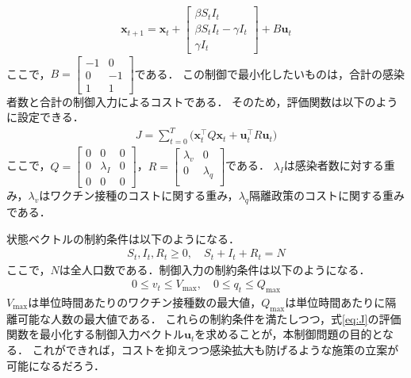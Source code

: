 \documentclass[a4j,onecolumn,10pt]{jresume}
\begin{document}
\begin{eqnarray}
\mathbf{x}_{t+1} = \mathbf{x}_{t}
+
\begin{bmatrix}
	\beta S_t I_t \\
\beta S_t I_t - \gamma I_t  \\
\gamma I_t 
\end{bmatrix}
+
B \mathbf{u}_t
\end{eqnarray}   
ここで，$B = \begin{bmatrix}
    -1 & 0 \\
    0 & -1 \\
    1 & 1
\end{bmatrix}$である．
この制御で最小化したいものは，合計の感染者数と合計の制御入力によるコストである．
そのため，評価関数は以下のように設定できる．
\begin{eqnarray}
    J = \sum_{t=0}^{T} \big( \mathbf{x}_t^\top Q \mathbf{x}_t + \mathbf{u}_t^\top R \mathbf{u}_t \big) \label{eq:J}
\end{eqnarray}
ここで，$Q = \begin{bmatrix}
    0 & 0 & 0\\
    0 & \lambda_I & 0 \\
    0 & 0 & 0
\end{bmatrix}$，$R = \begin{bmatrix}
    \lambda_v & 0 \\
    0 & \lambda_q \\
\end{bmatrix}$である．
$\lambda_I$は感染者数に対する重み，$\lambda_v$はワクチン接種のコストに関する重み，$\lambda_q$隔離政策のコストに関する重みである．

状態ベクトルの制約条件は以下のようになる．
\begin{eqnarray}  
S_t, I_t, R_t \geq 0, \quad S_t + I_t + R_t = N
\end{eqnarray}
ここで，$N$は全人口数である．制御入力の制約条件は以下のようになる．
\begin{eqnarray}  
0 \leq v_t\leq V_{\text{max}}, \quad 0 \leq q_t \leq Q_{\text{max}}
\end{eqnarray}
$V_{\text{max}}$は単位時間あたりのワクチン接種数の最大値，$Q_{\text{max}}$は単位時間あたりに隔離可能な人数の最大値である．
これらの制約条件を満たしつつ，式\ref{eq:J}の評価関数を最小化する制御入力ベクトル$\mathbf{u}_t$を求めることが，本制御問題の目的となる．
これができれば，コストを抑えつつ感染拡大も防げるような施策の立案が可能になるだろう．

\end{document}
